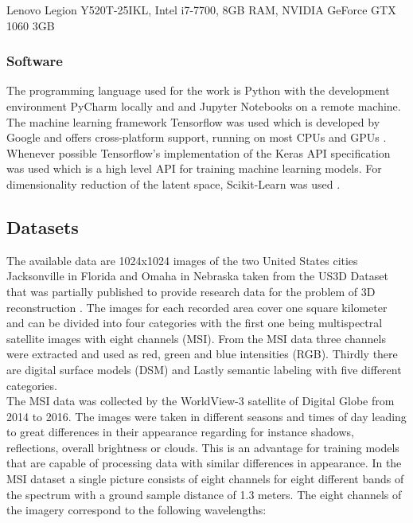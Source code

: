 Lenovo Legion Y520T-25IKL, Intel i7-7700, 8GB RAM, NVIDIA GeForce GTX 1060 3GB

\subsubsection{Software}

The programming language used for the work is Python \parencite{1995-rossum-python} with the development
environment PyCharm locally
and and Jupyter Notebooks on a remote machine. The machine learning framework Tensorflow was used which
is developed by Google and offers cross-platform support, running on most CPUs and GPUs 
\parencite{2015-martin-tensorflow}.
Whenever possible Tensorflow's implementation of the Keras API specification was used which is a high level API
for training machine learning models. For dimensionality reduction of the latent space, Scikit-Learn was used
\parencite{2011-pedregosa-scikit}.

\subsection{Datasets} \label{datasets}

The available data are 1024x1024 images of the two United States cities Jacksonville
in Florida and Omaha in Nebraska taken from the US3D Dataset that
was partially published to provide research data for the problem
of 3D reconstruction \parencite{2019-bosch-semantic}.
The images for each recorded area cover one square kilometer and can be divided 
into four categories with the first one being multispectral satellite images with eight channels (MSI). 
From the MSI data three channels were extracted and used as red, green and blue intensities (RGB). 
Thirdly there are digital surface models (DSM) and Lastly semantic labeling with five different categories. \\

The MSI data was collected by the WorldView-3 satellite of Digital Globe from 2014 to 2016.
The images were taken in different seasons and times of day leading to great differences
in their appearance regarding for instance shadows, reflections, overall brightness or clouds.
This is an advantage for training models that are capable of processing data with similar differences in 
appearance.
In the MSI dataset a single picture consists of eight channels for eight different bands of the spectrum with
a ground sample distance of 1.3 meters. The eight channels of the imagery correspond to the following wavelengths:

